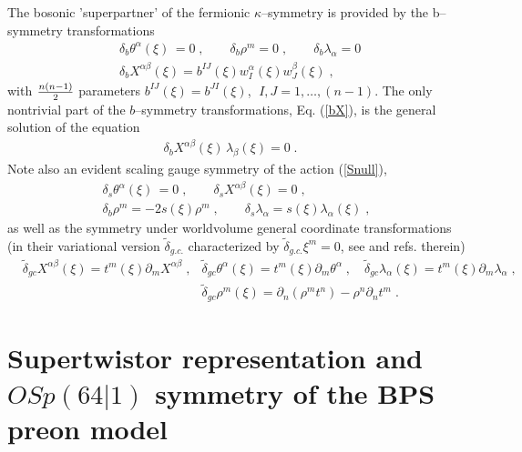 \documentclass[a4paper,11pt]{article}
\begin{document}
The bosonic 'superpartner' of the fermionic $\kappa$--symmetry 
is provided by the b--symmetry transformations   
\begin{eqnarray}
& \delta_{b} \theta^{\alpha}(\xi)\,= 0 \; , \qquad  \delta_{b} \rho^m = 0\;, 
 \qquad  \delta_{b} \lambda_{\alpha}=0 \; 
\nonumber
\\ 
\label{bX}  
& 
\delta_{b} X^{\alpha\beta}(\xi) = b^{IJ}(\xi) 
w_I^{\alpha}(\xi) w_J^{\beta}(\xi)
\; ,   
\quad 
\end{eqnarray} 
with ${n(n-1)\over 2}$ parameters $b^{IJ}(\xi)=  b^{JI}(\xi)$, 
$\; I, J=1,\ldots , (n-1)$.  
The only nontrivial part of the $b$--symmetry transformations, Eq. (\ref{bX}), 
is  the general solution of the equation 
\begin{eqnarray}
\label{bX0}  
\delta_{b} X^{\alpha\beta}(\xi) \,\lambda_{\beta}(\xi) = 0 \; . 
\quad 
\end{eqnarray} 
Note also an evident scaling gauge symmetry of the action
(\ref{Snull}),  
\begin{eqnarray}
 \delta_{s} \theta^{\alpha}(\xi)\,= 0\; , \qquad 
 \delta_{s} X^{\alpha\beta}(\xi) = 0\; , 
\nonumber 
\\ 
\label{slb}  
\delta_{b} \rho^m = - 2 s(\xi)  \rho^m \; , \qquad 
\delta_{s} \lambda_{\alpha}= s(\xi)\lambda_{\alpha}(\xi)
\; ,
\end{eqnarray} 
as well as the symmetry under worldvolume general coordinate transformations 
(in their variational version $\tilde{\delta}_{g.c.}$ 
characterized by $\tilde{\delta}_{g.c.}\xi^m=0$, see  
\cite{BdAI2} and refs. therein)
\begin{eqnarray}\label{gcX}  
 & \tilde{\delta}_{gc} X^{\alpha\beta}(\xi) 
= t^m(\xi) \partial_mX^{\alpha\beta} 
\; , & 
\tilde{\delta}_{gc}\theta^{\alpha}(\xi)  = t^m(\xi) \partial_m \theta^{\alpha} 
\; ,  \quad  
\tilde{\delta}_{gc}\lambda_{\alpha}(\xi) = t^m(\xi) \partial_m \lambda_{\alpha}
\; , 
\\ \label{gcr}
& & \tilde{\delta}_{gc} \rho^m (\xi) = 
\partial_n (\rho^m t^n) - \rho^n \partial_n t^m \; . 
\qquad 
\end{eqnarray} 



\section{ Supertwistor representation and 
$OSp(64|1)$ symmetry of the BPS preon model}   
\end{document}
